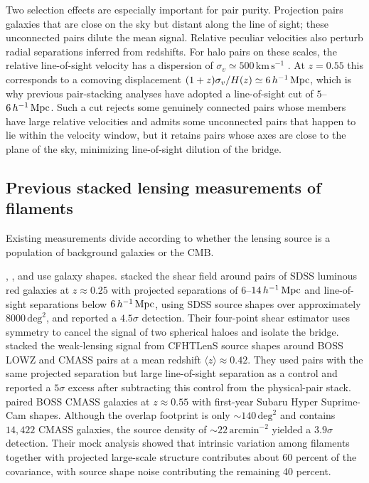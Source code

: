 Two selection effects are especially important for pair purity. Projection
pairs galaxies that are close on the sky but distant along the line of sight;
these unconnected pairs dilute the mean signal. Relative peculiar velocities
also perturb radial separations inferred from redshifts. For halo pairs on
these scales, the relative line-of-sight velocity has a dispersion of
$\sigma_{v}\simeq500\,\mathrm{km\,s^{-1}}$
\citep{Jenkins1998, deGraaff2019}. At $z=0.55$ this
corresponds to a comoving displacement $(1+z)\sigma_{v}/H(z)\simeq
6\,h^{-1}\,{\rm Mpc}$, which is why previous pair-stacking analyses have adopted a
line-of-sight cut of $5$--$6\,h^{-1}\,{\rm Mpc}$. Such a cut rejects some genuinely
connected pairs whose members have large relative velocities and admits some
unconnected pairs that happen to lie within the velocity window, but it
retains pairs whose axes are close to the plane of the sky, minimizing
line-of-sight dilution of the bridge.

\subsection{Previous stacked lensing measurements of filaments}

Existing measurements divide according to whether the lensing source is a
population of background galaxies or the CMB.

\citet{Clampitt2016}, \citet{EppsHudson2017}, and \citet{Kondo2020} use galaxy
shapes. \citet{Clampitt2016} stacked the shear field around pairs of SDSS
luminous red galaxies at $z\approx0.25$ with projected separations of
$6$--$14\,h^{-1}\,{\rm Mpc}$ and line-of-sight separations below $6\,h^{-1}\,{\rm Mpc}$, using
SDSS source shapes over approximately $8000\,\mathrm{deg}^{2}$, and reported
a $4.5\sigma$ detection. Their four-point shear estimator uses symmetry to
cancel the signal of two spherical haloes and isolate the bridge.
\citet{EppsHudson2017} stacked the weak-lensing signal from CFHTLenS source
shapes around BOSS LOWZ and CMASS pairs at a mean redshift
$\langle z\rangle\approx0.42$. They used pairs with the same projected
separation but large line-of-sight separation as a control and reported a
$5\sigma$ excess after subtracting this control from the physical-pair
stack. \citet{Kondo2020} paired BOSS CMASS galaxies at $z\approx0.55$ with
first-year Subaru Hyper Suprime-Cam shapes. Although
the overlap footprint is only $\sim140\,\mathrm{deg}^{2}$ and contains
$14{,}422$ CMASS galaxies, the source density of $\sim22\,\mathrm{arcmin}^{-2}$
yielded a $3.9\sigma$ detection. Their mock analysis showed that intrinsic
variation among filaments together with projected large-scale structure
contributes about 60 percent of the covariance, with source shape noise
contributing the remaining 40 percent.

